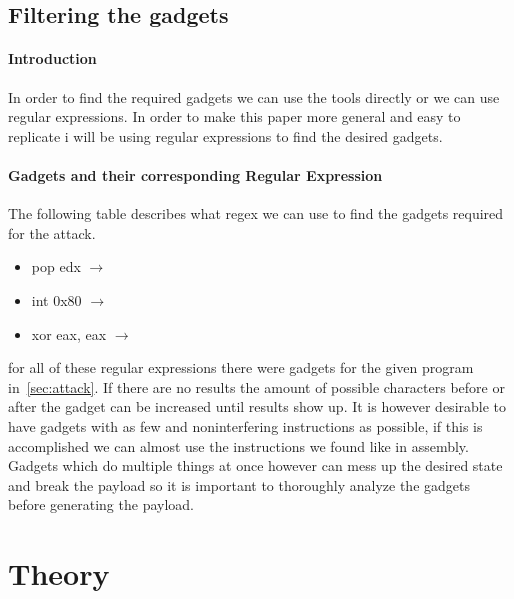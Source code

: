 \documentclass[journal=tosc,submission, notanonymous]{iacrtrans}
\begin{document}
\subsection{Filtering the gadgets}
\label{subsec:filtering}
\paragraph{Introduction}
In order to find the required gadgets we can use the tools directly or we can use regular expressions. In order to make this paper more general and easy to replicate i will be using regular expressions to find the desired gadgets.
\paragraph{Gadgets and their corresponding Regular Expression}
The following table describes what regex we can use to find the gadgets required for the attack.
\begin{itemize}
\item pop edx  $\rightarrow$ 
\item int 0x80  $\rightarrow$  
\item xor eax, eax  $\rightarrow$  
\end{itemize}
for all of these regular expressions there were gadgets for the given program in~\cref{sec:attack}. If there are no results the amount of possible characters before or after the gadget can be increased until results show up. It is however desirable to have gadgets with as few and noninterfering instructions as possible, if this is accomplished we can almost use the instructions we found like in assembly. Gadgets which do multiple things at once however can mess up the desired state and break the payload so it is important to thoroughly analyze the gadgets before generating the payload.

\section{Theory}
\end{document}
